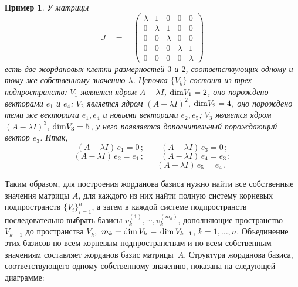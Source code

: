 \documentclass[12pt,a4paper]{article}
\newtheorem{ex}{Пример}
\begin{document}
\begin{ex}\label{ex.jor2}
{\em У  матрицы
$$
J \quad = \quad \left(
\begin{array}{ccccc}
\lambda & 1 & 0 & 0 & 0 \\
0 & \lambda & 1 & 0 & 0\\
0 & 0 & \lambda & 0 & 0 \\
0 & 0 & 0 & \lambda & 1\\
0 & 0 & 0 & 0 & \lambda
\end{array}
\right)
$$
есть две жордановых клетки размерностей $3$ и $2$, соответствующих одному и тому же собственному значению $\lambda$.
Цепочка $\{V_k\}$ состоит из трех подпространств:
$V_1$ является ядром $A - \lambda I$, ${\rm dim } V_1 = 2 $, оно порождено векторами $e_1$ и $e_4$;
 $V_2$ является ядром $(A - \lambda I)^2$, ${\rm dim } V_2 = 4 $, оно порождено теми же векторами $e_1, e_4$
 и новыми векторами $e_2, e_5$; $V_3$ является ядром $(A - \lambda I)^3$, ${\rm dim } V_3 = 5 $, у него появляется дополнительный порождающий вектор  $e_3$. Итак,
 $$
 (A - \lambda I)\, e_1 = 0\, ; \qquad (A - \lambda I)\, e_3 = 0\, ;
 $$
 $$
 (A - \lambda I)\, e_2 = e_1\, ; \qquad (A - \lambda I)\, e_4 = e_3\, ;
 $$
 $$
 \qquad \qquad \qquad \qquad \quad \ \ (A - \lambda I)\, e_5 = e_4\, .
 $$
}
\end{ex}
Таким образом, для построения жорданова базиса нужно найти все собственные значения
матрицы $A$, для каждого из них найти полную систему корневых подпространств $\{V_i\}_{i=1}^{n}$, а затем в каждой системе  подпространств последовательно выбрать базисы $v_{k}^{(1)} , \cdots , v_{k}^{(m_k)}$,
дополняющие пространство $V_{k-1}$ до пространства $V_{k}$, $\, m_k = {\rm dim }\, V_{k} \, - \, {\rm dim}\, V_{k-1}$,
 $k = 1, \ldots , n$. Объединение этих базисов по всем корневым подпространствам и по всем собственным
 значениям составляет жорданов базис матрицы~$A$. Структура жорданова базиса, соответствующего
 одному собственному значению, показана на следующей диаграмме:
\end{document}
